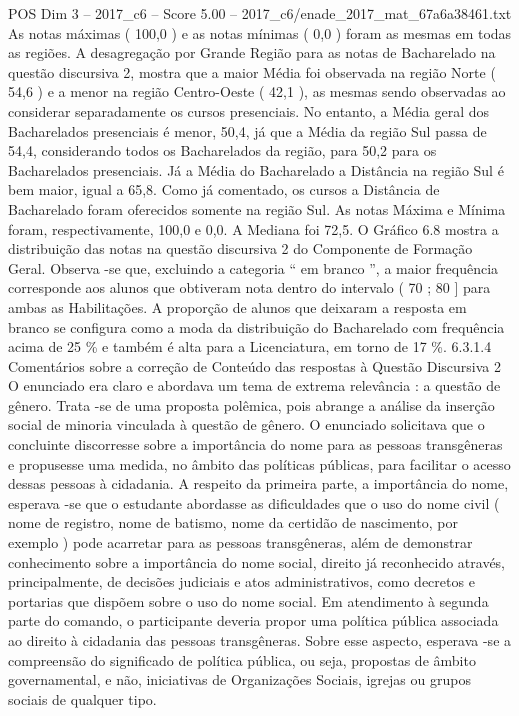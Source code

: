 \begin{textsample}{POS Dim 3 – 2017\_c6 – Score 5.00 – 2017\_c6/enade\_2017\_mat\_67a6a38461.txt}
As notas máximas ( 100,0 ) e as notas mínimas ( 0,0 ) foram as mesmas em todas as regiões.
A desagregação por Grande Região para as notas de Bacharelado na questão discursiva 2, mostra que a maior Média foi observada na região Norte ( 54,6 ) e a menor na região Centro-Oeste ( 42,1 ), as mesmas sendo observadas ao considerar separadamente os cursos presenciais.
No entanto, a Média geral dos Bacharelados presenciais é menor, 50,4, já que a Média da região Sul passa de 54,4, considerando todos os Bacharelados da região, para 50,2 para os Bacharelados presenciais.
Já a Média do Bacharelado a Distância na região Sul é bem maior, igual a 65,8.
Como já comentado, os cursos a Distância de Bacharelado foram oferecidos somente na região Sul.
As notas Máxima e Mínima foram, respectivamente, 100,0 e 0,0.
A Mediana foi 72,5.
O Gráfico 6.8 mostra a distribuição das notas na questão discursiva 2 do Componente de Formação Geral.
Observa -se que, excluindo a categoria “ em branco ”, a maior frequência corresponde aos alunos que obtiveram nota dentro do intervalo ( 70 ; 80 ] para ambas as Habilitações.
A proporção de alunos que deixaram a resposta em branco se configura como a moda da distribuição do Bacharelado com frequência acima de 25 \% e também é alta para a Licenciatura, em torno de 17 \%. 6.3.1.4 Comentários sobre a correção de Conteúdo das respostas à Questão Discursiva 2 O enunciado era claro e abordava um tema de extrema relevância : a questão de gênero.
Trata -se de uma proposta polêmica, pois abrange a análise da inserção social de minoria vinculada à questão de gênero.
O enunciado solicitava que o concluinte discorresse sobre a importância do nome para as pessoas transgêneras e propusesse uma medida, no âmbito das políticas públicas, para facilitar o acesso dessas pessoas à cidadania.
A respeito da primeira parte, a importância do nome, esperava -se que o estudante abordasse as dificuldades que o uso do nome civil ( nome de registro, nome de batismo, nome da certidão de nascimento, por exemplo ) pode acarretar para as pessoas transgêneras, além de demonstrar conhecimento sobre a importância do nome social, direito já reconhecido através, principalmente, de decisões judiciais e atos administrativos, como decretos e portarias que dispõem sobre o uso do nome social.
Em atendimento à segunda parte do comando, o participante deveria propor uma política pública associada ao direito à cidadania das pessoas transgêneras.
Sobre esse aspecto, esperava -se a compreensão do significado de política pública, ou seja, propostas de âmbito governamental, e não, iniciativas de Organizações Sociais, igrejas ou grupos sociais de qualquer tipo.

\end{textsample}
